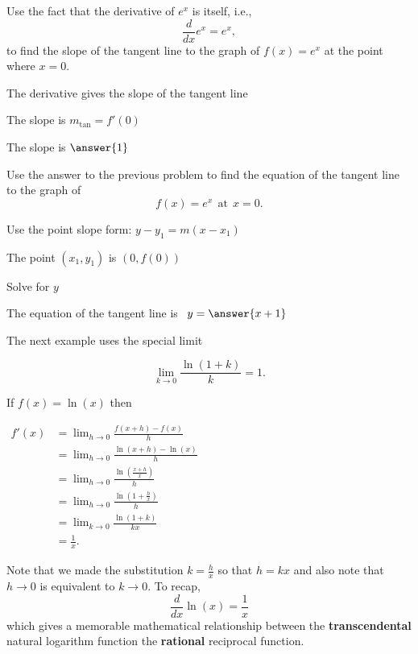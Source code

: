 \documentclass{ximera}
\begin{document}
\begin{problem} %
Use the fact that the derivative of $e^x$ is itself,
i.e., 
\[
\frac{d}{dx}e^x=e^x,
\]
to find the slope of the tangent line to the graph of 
$f(x) = e^x$ at the point where $x = 0$.\\
\begin{hint}
The derivative gives the slope of the tangent line
\end{hint}
\begin{hint}
The slope is $m_{\text{tan}} = f'(0)$
\end{hint}
The slope is $\answer{1}$
\end{problem}





\begin{problem} %
Use the answer to the previous problem to find the equation of the tangent line to the graph of 
\[
f(x) = e^x \ \ \text{at} \ \ x=0.
\]
\begin{hint}
Use the point slope form: $y-y_1 = m(x-x_1)$
\end{hint}
\begin{hint}
The point $(x_1,y_1)$ is $(0, f(0))$
\end{hint}
\begin{hint}
Solve for $y$
\end{hint}
The equation of the tangent line is \ $y = \answer{x+1}$
\end{problem}



The next example uses the special limit 

\[\lim_{k \to 0} \frac{\ln(1 + k)}{k} = 1.\]



\begin{example}[example 11]
If $f(x) = \ln(x)$ then\\[10pt]
\begin{center}
$\begin{aligned}
f'(x) &= \lim_{h \to 0} \frac{f(x+h)-f(x)}{h}\\[5pt]
&= \lim_{h \to 0}\frac{\ln(x+h)-\ln(x)}{h}\\[5pt]
&= \lim_{h \to 0} \frac{\ln(\frac{x+h}{x})}{h}\\[5pt]
&= \lim_{h \to 0}\frac{\ln(1 + \frac{h}{x})}{h}\\[5pt]
&= \lim_{k \to 0} \frac{\ln(1 + k)}{kx} \\[5pt]
&= \frac{1}{x}.
\end{aligned}$
\end{center}

Note that we made the substitution $k =\frac{h}{x}$ so that $h = kx$ and  also note 
that $h\to 0$ is equivalent to $k\to 0$.
To recap, 
\[
\frac{d}{dx} \ln(x) = \frac{1}{x}
\]
which gives a memorable mathematical relationship between the \textbf{transcendental} natural logarithm function 
the \textbf{rational} reciprocal function.

\end{example}
\end{document}
